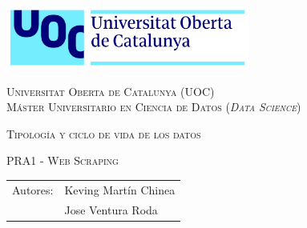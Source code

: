 \newpage
\thispagestyle{empty}

\centerline{\includegraphics[width=0.6\textwidth]{images/UOC-logo.png}}
\begin{center}
\textsc{Universitat Oberta de Catalunya (UOC) \\
 Máster Universitario en Ciencia de Datos (\textit{Data Science})\\}


\vspace*{1.5cm}

\textsc{\Large Tipología y ciclo de vida de los datos}

\vspace*{0.5cm}

\textsc{\large PRA1 - Web Scraping}

\vspace*{1cm}

\begin{tabular}{@{}rl@{}}
\toprule
    Autores:& Keving Martín Chinea\\
            & Jose Ventura Roda\\
\bottomrule
\end{tabular}
\end{center}
